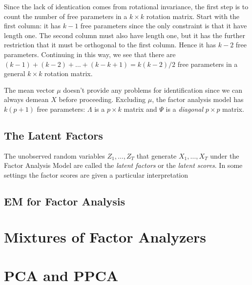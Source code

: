 \documentclass[12pt]{article}
\theoremstyle{definition}
\begin{document}
Since the lack of identication comes from rotational invariance, the first step is to count the number of free parameters in a $k\times k$ rotation matrix. Start with the first column: it has $k-1$ free parameters since the only constraint is that it have length one. The second column must also have length one, but it has the further restriction that it must be orthogonal to the first column. Hence it has $k - 2$ free parameters. Continuing in this way, we see that there are $(k - 1) + (k - 2) + \hdots + (k - k + 1) = k(k-2)/2$ free parameters in a general $k\times k$ rotation matrix. 

The mean vector $\mu$ doesn't provide any problems for identification since we can always demean $X$ before proceeding. Excluding $\mu$, the factor analysis model has $k(p + 1)$ free parameters: $\Lambda$ is a $p\times k$ matrix and $\Psi$ is a \emph{diagonal} $p\times p$ matrix.

\subsection{The Latent Factors}
The unobserved random variables $Z_1, \hdots, Z_T$ that generate $X_1, \hdots, X_T$ under the Factor Analysis Model are called the \emph{latent factors} or the \emph{latent scores}. In some settings the factor scores are given a particular interpretation 


\subsection{EM for Factor Analysis}


\section{Mixtures of Factor Analyzers}

\section{PCA and PPCA}
\end{document}
